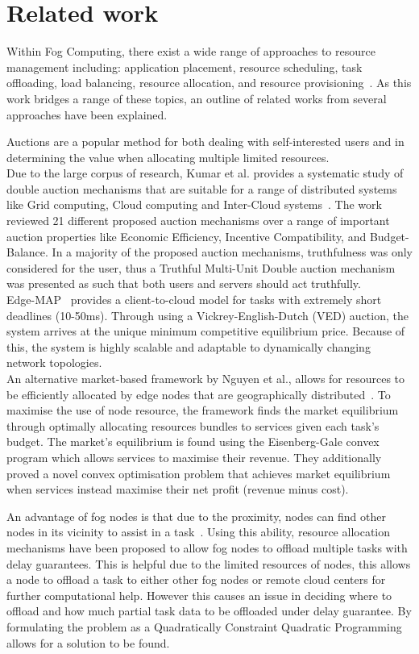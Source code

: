 \section{Related work}
\label{sec:related-work}
Within Fog Computing, there exist a wide range of approaches to resource management including:
application placement, resource scheduling, task offloading, load balancing, resource allocation,
and resource provisioning~\cite{ghobaei2019resource}. As this work bridges a range of these topics, an outline of
related works from several approaches have been explained.

Auctions are a popular method for both dealing with self-interested users and in determining the value when allocating
multiple limited resources. \\
Due to the large corpus of research, Kumar et al. provides a systematic study of double auction mechanisms that are
suitable for a range of distributed systems like Grid computing, Cloud computing and Inter-Cloud
systems~\cite{KUMAR2017234}. The work reviewed 21 different proposed auction mechanisms over a range of important auction
properties like Economic Efficiency, Incentive Compatibility, and Budget-Balance. In a majority of the proposed auction
mechanisms, truthfulness was only considered for the user, thus a Truthful Multi-Unit Double auction mechanism was
presented as such that both users and servers should act truthfully. \\
Edge-MAP~\cite{tasiopoulos2018edge} provides a client-to-cloud model for tasks with extremely short deadlines
(10-50ms). Through using a Vickrey-English-Dutch (VED) auction, the system arrives at the unique minimum competitive
equilibrium price. Because of this, the system is highly scalable and adaptable to dynamically changing network
topologies. \\
An alternative market-based framework by Nguyen et al., allows for resources to be efficiently allocated by edge nodes
that are geographically distributed~\cite{8373684}. To maximise the use of node resource, the framework finds the market
equilibrium through optimally allocating resources bundles to services given each task's budget. The market's
equilibrium is found using the Eisenberg-Gale convex program which allows services to maximise their revenue. They
additionally proved a novel convex optimisation problem that achieves market equilibrium when services instead maximise
their net profit (revenue minus cost).

An advantage of fog nodes is that due to the proximity, nodes can find other nodes in its vicinity to assist in a
task~\cite{8839780}. Using this ability, resource allocation mechanisms have been proposed to allow fog nodes to offload
multiple tasks with delay guarantees. This is helpful due to the limited resources of nodes, this allows a node to
offload a task to either other fog nodes or remote cloud centers for further computational help. However this causes an
issue in deciding where to offload and how much partial task data to be offloaded under delay guarantee. By formulating
the problem as a Quadratically Constraint Quadratic Programming allows for a solution to be found.

